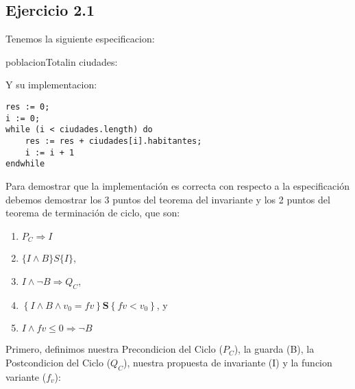 \documentclass[10pt,a4paper]{article}
\begin{document}
\subsection{Ejercicio 2.1}
Tenemos la siguiente especificacion: \\
\begin{proc}{poblacionTotal}{in ciudades: }{\ent}

\vspace{0.2cm}
    
\end{proc}
Y su implementacion:\\

	\begin{lstlisting}[caption={Implementacion de la especificacion en SmallLang},label=code:for]
res := 0;
i := 0;
while (i < ciudades.length) do
	res := res + ciudades[i].habitantes;
	i := i + 1
endwhile
	\end{lstlisting}

Para demostrar que la implementación es correcta con respecto a la especificación debemos demostrar los 3 puntos del teorema del invariante y los 2 puntos del teorema de terminación de ciclo, que son:
\vspace{0.2cm}
\begin{enumerate}\setlength\itemsep{0cm}
    \item $P_C \Rightarrow I$
    \item $\{I \wedge B\} S\{I\}$,
    \item $I \wedge \neg B \Rightarrow Q_C$,
    \item $\left\{I \wedge B \wedge v_0=f v\right\} \mathbf{S}\left\{f v<v_0\right\}$, y
    \item $I \wedge f v \leq 0 \Rightarrow \neg B$
\end{enumerate}

Primero, definimos nuestra Precondicion del Ciclo ($P_C$), la guarda (B), la Postcondicion del Ciclo ($Q_C$), nuestra propuesta de invariante (I) y la funcion variante ($f_v$):
\end{document}
